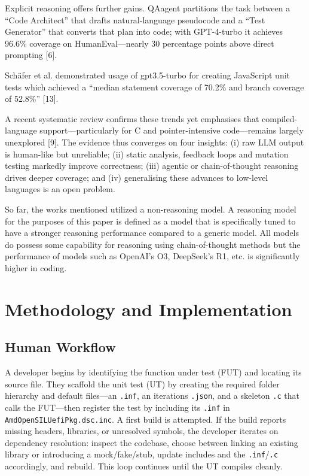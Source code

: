 \documentclass[conference]{IEEEtran}
\begin{document}
Explicit reasoning offers further gains. QAagent partitions the task between a “Code Architect” that drafts natural-language pseudocode and a “Test Generator” that converts that plan into code; with GPT-4-turbo it achieves 96.6\% coverage on HumanEval—nearly 30 percentage points above direct prompting [6]. 

Schäfer et al. demonstrated usage of gpt3.5-turbo for creating JavaScript unit tests which achieved a “median statement coverage of 70.2\% and branch coverage of 52.8\%” [13]. 

A recent systematic review confirms these trends yet emphasises that compiled-language support—particularly for C and pointer-intensive code—remains largely unexplored [9]. The evidence thus converges on four insights: (i) raw LLM output is human-like but unreliable; (ii) static analysis, feedback loops and mutation testing markedly improve correctness; (iii) agentic or chain-of-thought reasoning drives deeper coverage; and (iv) generalising these advances to low-level languages is an open problem.  

So far, the works mentioned utilized a non-reasoning model. A reasoning model for the purposes of this paper is defined as a model that is specifically tuned to have a stronger reasoning performance compared to a generic model. All models do possess some capability for reasoning using chain-of-thought methods but the performance of models such as OpenAI’s O3, DeepSeek’s R1, etc. is significantly higher in coding. 


\section{Methodology and Implementation}
\subsection{Human Workflow}
A developer begins by identifying the function under test (FUT) and locating its source file. They scaffold the unit test (UT) by creating the required folder hierarchy and default files—an \texttt{.inf}, an iterations \texttt{.json}, and a skeleton \texttt{.c} that calls the FUT—then register the test by including its \texttt{.inf} in \texttt{AmdOpenSILUefiPkg.dsc.inc}. A first build is attempted. If the build reports missing headers, libraries, or unresolved symbols, the developer iterates on dependency resolution: inspect the codebase, choose between linking an existing library or introducing a mock/fake/stub, update includes and the \texttt{.inf}/\texttt{.c} accordingly, and rebuild. This loop continues until the UT compiles cleanly.
\end{document}
